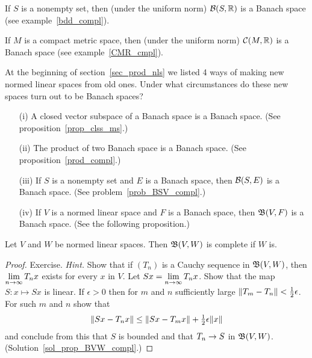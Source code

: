 \begin{exam} If $S$ is a nonempty set, then (under the uniform norm) $\mathcal{B}(S,\mathbb{R})$ is a
Banach space (see example~\ref{bdd_compl}).
\end{exam}

\begin{exam} If $M$ is a compact metric space, then (under the uniform norm) $\mathcal{C}(M,\mathbb{R})$
is a Banach space (see example~\ref{CMR_cmpl}).
\end{exam}

At the beginning of section~\ref{sec_prod_nls} we listed 4 ways of making new normed linear
spaces from old ones. Under what circumstances do these new spaces turn out to be Banach
spaces?
 \begin{enumerate}
  \item[(i)] A closed vector subspace of a Banach space is a Banach space.
(See proposition~\ref{prop_clss_ms}.)
  \item[(ii)] The product of two Banach space is a Banach space.
(See proposition~\ref{prod_compl}.)
  \item[(iii)] If $S$ is a nonempty set and $E$ is a Banach space, then $\mathcal{B}(S,E)$ is a Banach
space. (See problem~\ref{prob_BSV_compl}.)
  \item[(iv)] If $V$ is a normed linear space and $F$ is a Banach space, then $\mathfrak{B}(V,F)$ is
a Banach space. (See the following proposition.)
 \end{enumerate}

\begin{prop}\label{prop_BVW_compl}  Let $V$ and $W$ be normed linear spaces. Then $\mathfrak{B}(V,W)$
is complete if $W$ is.
\end{prop}

\begin{proof} Exercise. \emph{Hint.} Show that if $(T_n)$ is a Cauchy sequence in $\mathfrak{B}(V,W)$,
then $\lim\limits_{n \rightarrow \infty} T_nx$ exists for every $x$ in $V$.  Let $Sx = \lim\limits_{n
\rightarrow \infty} T_nx$.  Show that the map $S\colon x \mapsto Sx$ is linear. If $\epsilon > 0$
then for $m$ and $n$ sufficiently large $\lVert T_m - T_n\rVert < \frac12 \epsilon$.  For such $m$
and $n$ show that
  \[ \lVert Sx - T_nx\rVert \le \lVert Sx - T_mx\rVert + \tfrac12 \epsilon \lVert x\rVert \]
and conclude from this that $S$ is bounded and that $T_n \rightarrow S$ in $\mathfrak{B}(V,W)$.
(Solution~\ref{sol_prop_BVW_compl}.) \ns
\end{proof}

